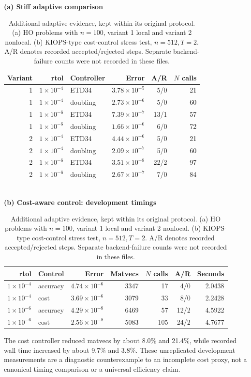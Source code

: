 \begin{table}[H]\centering\small
\caption{Additional adaptive evidence, kept within its original protocol. (a) HO problems with $n=100$, variant 1 local and variant 2 nonlocal. (b) KIOPS-type cost-control stress test, $n=512,T=2$. A/R denotes recorded accepted/rejected steps. Separate backend-failure counts were not recorded in these files.}\label{tab:adaptive-extra}
\textbf{(a) Stiff adaptive comparison}\\[4pt]
\begin{tabular}{@{}rrlrrr@{}}\toprule
Variant & rtol & Controller & Error & A/R & $N$ calls\\\midrule
1 & $1\times10^{-4}$ & ETD34 & $3.78\times10^{-5}$ & 5/0 & 21 \\
1 & $1\times10^{-4}$ & doubling & $2.73\times10^{-6}$ & 5/0 & 60 \\
1 & $1\times10^{-6}$ & ETD34 & $7.39\times10^{-7}$ & 13/1 & 57 \\
1 & $1\times10^{-6}$ & doubling & $1.66\times10^{-6}$ & 6/0 & 72 \\
2 & $1\times10^{-4}$ & ETD34 & $4.44\times10^{-6}$ & 5/0 & 21 \\
2 & $1\times10^{-4}$ & doubling & $2.09\times10^{-7}$ & 5/0 & 60 \\
2 & $1\times10^{-6}$ & ETD34 & $3.51\times10^{-8}$ & 22/2 & 97 \\
2 & $1\times10^{-6}$ & doubling & $2.67\times10^{-7}$ & 7/0 & 84 \\
\bottomrule\end{tabular}\\[12pt]
\textbf{(b) Cost-aware control: development timings}\\[4pt]
\begin{tabular}{@{}rlrrrrr@{}}\toprule
rtol & Control & Error & Matvecs & $N$ calls & A/R & Seconds\\\midrule
$1\times10^{-4}$ & accuracy & $4.74\times10^{-6}$ & 3347 & 17 & 4/0 & 2.0438 \\
$1\times10^{-4}$ & cost & $3.69\times10^{-6}$ & 3079 & 33 & 8/0 & 2.2428 \\
$1\times10^{-6}$ & accuracy & $4.29\times10^{-8}$ & 6469 & 57 & 12/2 & 4.5922 \\
$1\times10^{-6}$ & cost & $2.56\times10^{-8}$ & 5083 & 105 & 24/2 & 4.7677 \\
\bottomrule\end{tabular}
\par\smallskip\footnotesize
The cost controller reduced matvecs by about 8.0\% and 21.4\%, while recorded wall time increased by about 9.7\% and 3.8\%. These unreplicated development measurements are a diagnostic counterexample to an incomplete cost proxy, not a canonical timing comparison or a universal efficiency claim.
\end{table}
